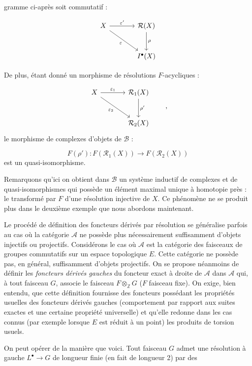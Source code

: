 %
gramme ci-après soit commutatif :

\[
\begin{tikzcd}[column sep=large,row sep=large]
X \arrow[r,"\varepsilon'"] \arrow[dr,"\varepsilon"']
  & \mathcal R(X) \arrow[d,"\rho"] \\
  & I^{\bullet}(X)
\end{tikzcd}
\]

De plus, étant donné un morphisme de résolutions $F$-acycliques :

\[
\begin{tikzcd}[column sep=large,row sep=large]
X \arrow[r,"\varepsilon_1"] \arrow[dr,"\varepsilon_2"']
  & \mathcal R_1(X) \arrow[d,"\rho'"] \\
  & \mathcal R_2(X)
\end{tikzcd}
\qquad\text{,}
\]
le morphisme de complexes d'objets de $\mathcal B$ :

\[
F(\rho') : F(\mathcal R_1(X)) \longrightarrow F(\mathcal R_2(X))
\]
est un quasi-isomorphisme.

Remarquons qu'ici on obtient dans $\mathcal B$ un système inductif de
complexes et de quasi-isomorphismes qui possède un élément maximal unique à
homotopie près : le transformé par $F$ d'une résolution injective de $X$. Ce
phénomène ne se produit plus dans le deuxième exemple que nous abordons
maintenant.

Le procédé de définition des foncteurs dérivés par résolution se généralise
parfois au cas où la catégorie $\mathcal A$ ne possède plus nécessairement
suffisamment d'objets injectifs ou projectifs. Considérons le cas où
$\mathcal A$ est la catégorie des faisceaux de groupes commutatifs sur un
espace topologique $E$. Cette catégorie ne possède pas, en général,
suffisamment d'objets projectifs. On se propose néanmoins de définir les
\emph{foncteurs dérivés gauches} du foncteur exact à droite de $\mathcal A$
dans $\mathcal A$ qui, à tout faisceau $G$, associe le faisceau
$F\otimes_{\mathbb Z}G$ ($F$ faisceau fixe). On exige, bien entendu, que cette
définition fournisse des foncteurs possédant les propriétés usuelles des
foncteurs dérivés gauches (comportement par rapport aux suites exactes et une
certaine propriété universelle) et qu'elle redonne dans les cas connus (par
exemple lorsque $E$ est réduit à un point) les produits de torsion usuels.

On peut opérer de la manière que voici. Tout faisceau $G$ admet une résolution
à gauche $L^{\bullet}\to G$ de longueur finie (en fait de longueur 2) par des
